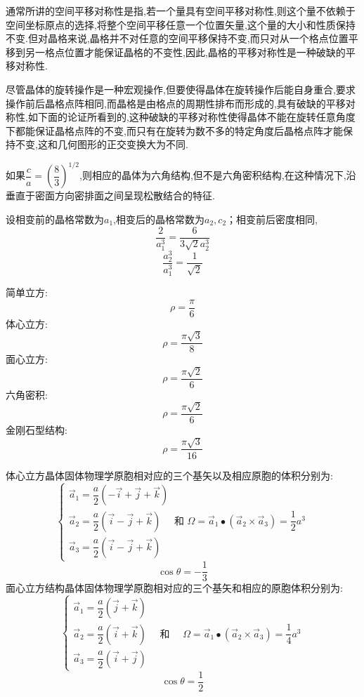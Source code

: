 \documentclass[UTF8,12pt, a4paper, oneside]{ctexart}
\begin{document}
    {通常所讲的空间平移对称性是指,若一个量具有空间平移对称性,则这个量不依赖于空间坐标原点的选择,将整个空间平移任意一个位置矢量,这个量的大小和性质保持不变.但对晶格来说,晶格并不对任意的空间平移保持不变,而只对从一个格点位置平移到另一格点位置才能保证晶格的不变性,因此,晶格的平移对称性是一种破缺的平移对称性.}

    {尽管晶体的旋转操作是一种宏观操作,但要使得晶体在旋转操作后能自身重合,要求操作前后晶格点阵相同,而晶格是由格点的周期性排布而形成的,具有破缺的平移对称性,如下面的论证所看到的,这种破缺的平移对称性使得晶体不能在旋转任意角度下都能保证晶格点阵的不变,而只有在旋转为数不多的特定角度后晶格点阵才能保持不变,这和几何图形的正交变换大为不同.}

    {如果$\dfrac{c}{a}=(\dfrac{8}{3})^{1/2}$,则相应的晶体为六角结构,但不是六角密积结构,在这种情况下,沿垂直于密面方向密排面之间呈现松散结合的特征.}
 
    {设相变前的晶格常数为$a_1$,相变后的晶格常数为$a_2,c_2$；相变前后密度相同,\[ \dfrac{2}{a_1^3}=\dfrac{6}{3\sqrt{2}a_2^3}\]
        \[ \dfrac{a_2^3}{a_1^3}=\dfrac{1}{\sqrt{2}}\]}

    {简单立方:\[\rho=\dfrac{\pi}{6}\]
    体心立方:\[\rho=\dfrac{\pi \sqrt{3}}{8}\]
    面心立方:\[\rho=\dfrac{\pi \sqrt{2} }{6}\]
    六角密积:\[\rho=\dfrac{\pi \sqrt{2} }{6}\]
    金刚石型结构:\[\rho=\dfrac{\pi \sqrt{3} }{16}\]}

    {体心立方晶体固体物理学原胞相对应的三个基矢以及相应原胞的体积分别为:\[\left\{\begin{array}{l}
     \vec{a}_{1}=\dfrac{a}{2}(-\vec{i}+\vec{j}+\vec{k}) \\
     \vec{a}_{2}=\dfrac{a}{2}(\vec{i}-\vec{j}+\vec{k}) \quad \text { 和 } \Omega=\vec{a}_{1} \bullet\left(\vec{a}_{2} \times \vec{a}_{3}\right)=\dfrac{1}{2} a^{3} \\
     \vec{a}_{3}=\dfrac{a}{2}(\vec{i}-\vec{j}+\vec{k}) 
    \end{array}\right.\]  \[\cos \theta=-\dfrac{1}{3}\] 面心立方结构晶体固体物理学原胞相对应的三个基矢和相应的原胞体积分别为:\[\left\{\begin{array}{l}
    \vec{a}_{1}=\dfrac{a}{2}(\vec{j}+\vec{k}) \\
    \vec{a}_{2}=\dfrac{a}{2}(\vec{i}+\vec{k}) \quad \text { 和 } \quad \Omega=\vec{a}_{1} \bullet\left(\vec{a}_{2} \times \vec{a}_{3}\right)=\dfrac{1}{4} a^{3}  \\
     \vec{a}_{3}=\dfrac{a}{2}(\vec{i}+\vec{j}) 
     \end{array}\right.\] \[ \cos \theta=\dfrac{1}{2}\]}
\end{document}
